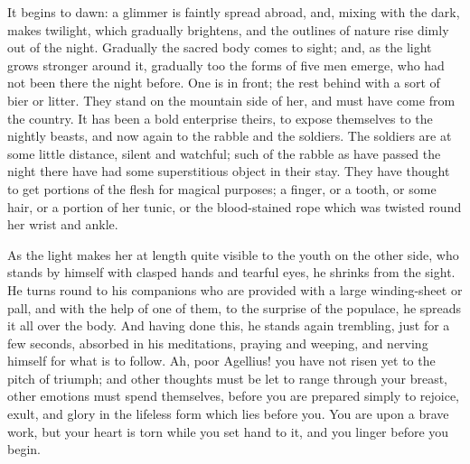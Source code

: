 It begins to dawn: a glimmer is faintly spread abroad, and, mixing
with the dark, makes twilight, which gradually brightens, and the
outlines of nature rise dimly out of the night. Gradually the sacred
body comes to sight; and, as the light grows stronger around it,
gradually too the forms of five men emerge, who had not been there the
night before. One is in front; the rest behind with a sort of bier or
litter. They stand on the mountain side of her, and must have come
from the country. It has been a bold enterprise theirs, to expose
themselves to the nightly beasts, and now again to the rabble and the
soldiers. The soldiers are at some little distance, silent and
watchful; such of the rabble as have passed the night there have had
some superstitious object in their stay. They have thought to get
portions of the flesh for magical purposes; a finger, or a tooth, or
some hair, or a portion of her tunic, or the blood-stained rope which
was twisted round her wrist and ankle.

As the light makes her at length quite visible to the youth on the
other side, who stands by himself with clasped hands and tearful eyes,
he shrinks from the sight. He turns round to his companions who are
provided with a large winding-sheet or pall, and with the help of one
of them, to the surprise of the populace, he spreads it all over the
body. And having done this, he stands again trembling, just for a few
seconds, absorbed in his meditations, praying and weeping, and
nerving himself for what is to follow. Ah, poor Agellius! you have not
risen yet to the pitch of triumph; and other thoughts must be let to
range through your breast, other emotions must spend themselves,
before you are prepared simply to rejoice, exult, and glory in the
lifeless form which lies before you. You are upon a brave work, but
your heart is torn while you set hand to it, and you linger before you
begin.

